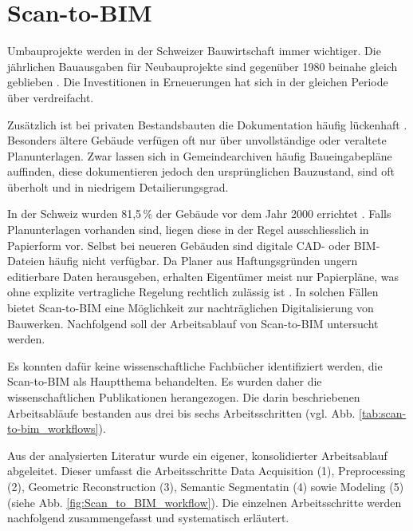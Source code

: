 \section{Scan-to-BIM}
\begin{German}
    Umbauprojekte werden in der Schweizer Bauwirtschaft immer wichtiger. Die jährlichen Bauausgaben für Neubauprojekte sind gegenüber 1980 beinahe gleich geblieben \cite{bundesamtfuerstatstikBauausgabenNachArt}. Die Investitionen in Erneuerungen hat sich in der gleichen Periode über verdreifacht. 
    
    Zusätzlich ist bei privaten Bestandsbauten die Dokumentation häufig lückenhaft \cite{dewolfCircularBuiltEnvironment,kadenLeitfadenGeodaesieUnd}. Besonders ältere Gebäude verfügen oft nur über unvollständige oder veraltete Planunterlagen. Zwar lassen sich in Gemeindearchiven häufig Baueingabepläne auffinden, diese dokumentieren jedoch den ursprünglichen Bauzustand, sind oft überholt und in niedrigem Detailierungsgrad.

    In der Schweiz wurden 81,5\,\% der Gebäude vor dem Jahr 2000 errichtet \cite{bundesamtfuerstatstikBauperiode}. Falls Planunterlagen vorhanden sind, liegen diese in der Regel ausschliesslich in Papierform vor. Selbst bei neueren Gebäuden sind digitale CAD- oder BIM-Dateien häufig nicht verfügbar. Da Planer aus Haftungsgründen ungern editierbare Daten herausgeben, erhalten Eigentümer meist nur Papierpläne, was ohne explizite vertragliche Regelung rechtlich zulässig ist \cite{bundschwBauenRechtenUnd}. In solchen Fällen bietet Scan-to-BIM eine Möglichkeit zur nachträglichen Digitalisierung von Bauwerken. Nachfolgend soll der Arbeitsablauf von Scan-to-BIM untersucht werden.

    Es konnten dafür keine wissenschaftliche Fachbücher identifiziert werden, die Scan-to-BIM als Hauptthema behandelten. Es wurden daher die wissenschaftlichen Publikationen \cite{wangApplicationOrientedScantoBIM2019, badenkoSCANTOBIMMETHODOLOGYADAPTED2019, borrusoProceduralPointCloud2023, rashdiScanningTechnologiesBuilding2022} herangezogen. Die darin beschriebenen Arbeitsabläufe bestanden aus drei bis sechs Arbeitsschritten (vgl. Abb. \ref{tab:scan-to-bim_workflows}).
    
    Aus der analysierten Literatur wurde ein eigener, konsolidierter Arbeitsablauf abgeleitet. Dieser umfasst die Arbeitsschritte Data Acquisition (1), Preprocessing (2), Geometric Reconstruction (3), Semantic Segmentatin (4) sowie Modeling (5) (siehe Abb. \ref{fig:Scan_to_BIM_workflow}). Die einzelnen Arbeitsschritte werden nachfolgend zusammengefasst und systematisch erläutert.
\end{German}

